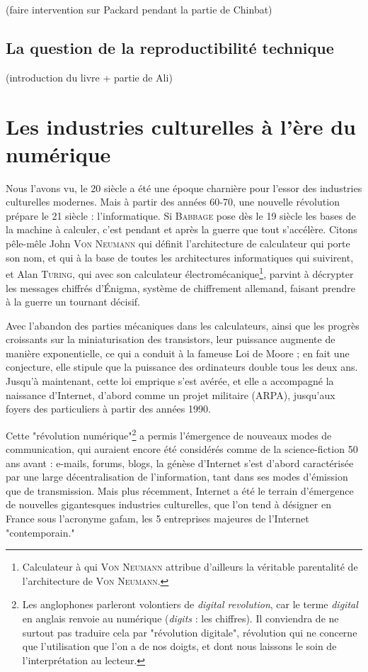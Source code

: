 \documentclass[a4paper,12pt]{report}
\begin{document}
(faire intervention sur Packard pendant la partie de Chinbat)

\subsection{La question de la reproductibilité technique}

(introduction du livre + partie de Ali)

\section{Les industries culturelles à l'ère du numérique}

Nous l'avons vu, le 20 siècle a été une époque charnière pour l'essor des industries culturelles modernes. Mais à partir des années 60-70, une nouvelle révolution prépare le 21 siècle : l'informatique. Si \textsc{Babbage} pose dès le 19 siècle les bases de la machine à calculer, c'est pendant et après la guerre que tout s'accélère. Citons pêle-mêle John \textsc{Von Neumann} qui définit l'architecture de calculateur qui porte son nom, et qui à la base de toutes les architectures informatiques qui suivirent, et Alan \textsc{Turing}, qui avec son calculateur électromécanique\footnote{Calculateur à qui \textsc{Von Neumann} attribue d'ailleurs la véritable parentalité de l'architecture de \textsc{Von Neumann}.}, parvint à décrypter les messages chiffrés d'Énigma, système de chiffrement allemand, faisant prendre à la guerre un tournant décisif.

Avec l'abandon des parties mécaniques dans les calculateurs, ainsi que les progrès croissants sur la miniaturisation des transistors, leur puissance augmente de manière exponentielle, ce qui a conduit à la fameuse Loi de Moore ; en fait une conjecture, elle stipule que la puissance des ordinateurs double tous les deux ans. Jusqu'à maintenant, cette loi emprique s'est avérée, et elle a accompagné la naissance d'Internet, d'abord comme un projet militaire (ARPA), jusqu'aux foyers des particuliers à partir des années 1990.

Cette "révolution numérique"\footnote{Les anglophones parleront volontiers de \textit{digital revolution}, car le terme \textit{digital} en anglais renvoie au numérique (\textit{digits} : les chiffres). Il conviendra de ne surtout pas traduire cela par "révolution digitale", révolution qui ne concerne que l'utilisation que l'on a de nos doigts, et dont nous laissons le soin de l'interprétation au lecteur.} a permis l'émergence de nouveaux modes de communication, qui auraient encore été considérés comme de la science-fiction 50 ans avant : e-mails, forums, blogs, la génèse d'Internet s'est d'abord caractérisée par une large décentralisation de l'information, tant dans ses modes d'émission que de transmission. Mais plus récemment, Internet a été le terrain d'émergence de nouvelles gigantesques industries culturelles, que l'on tend à désigner en France sous l'acronyme \gls{gafam}, les 5 entreprises majeures de l'Internet "contemporain."
\end{document}
